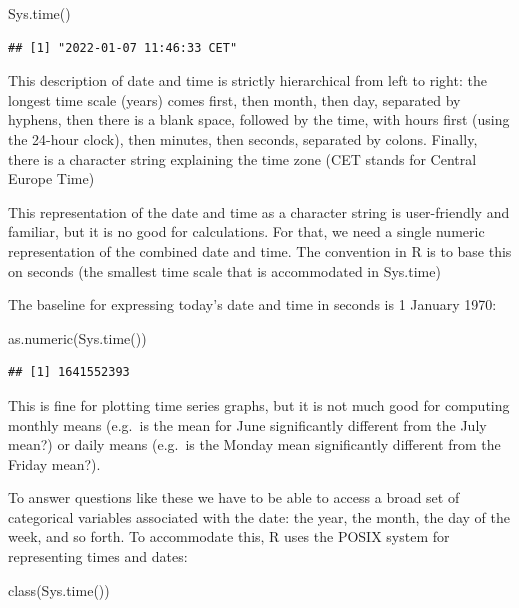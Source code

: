 \documentclass[
]{book}
\newenvironment{Shaded}{\begin{snugshade}}{\end{snugshade}}
\newcommand{\FunctionTok}[1]{\textcolor[rgb]{0.00,0.00,0.00}{#1}}
\newcommand{\NormalTok}[1]{#1}
\begin{document}
\begin{Shaded}
\begin{Highlighting}[]
\FunctionTok{Sys.time}\NormalTok{()}
\end{Highlighting}
\end{Shaded}

\begin{verbatim}
## [1] "2022-01-07 11:46:33 CET"
\end{verbatim}

This description of date and time is strictly hierarchical from left to right: the longest time scale (years) comes first, then month, then day, separated by hyphens, then there is a blank space, followed by the time, with hours first (using the 24-hour clock), then minutes, then seconds, separated by colons. Finally, there is a character string explaining the time zone (CET stands for Central Europe Time)

This representation of the date and time as a character string is user-friendly and familiar, but it is no good for calculations. For that, we need a single numeric representation of the combined date and time. The convention in R is to base this on seconds (the smallest time scale that is accommodated in Sys.time)

The baseline for expressing today's date and time in seconds is 1 January 1970:

\begin{Shaded}
\begin{Highlighting}[]
\FunctionTok{as.numeric}\NormalTok{(}\FunctionTok{Sys.time}\NormalTok{())}
\end{Highlighting}
\end{Shaded}

\begin{verbatim}
## [1] 1641552393
\end{verbatim}

This is fine for plotting time series graphs, but it is not much good for computing monthly means (e.g.~is the mean for June significantly different from the July mean?) or daily means (e.g.~is the Monday mean significantly different from the Friday mean?).

To answer questions like these we have to be able to access a broad set of categorical variables associated with the date: the year, the month, the day of the week, and so forth. To accommodate this, R uses the POSIX system for representing times and dates:

\begin{Shaded}
\begin{Highlighting}[]
\FunctionTok{class}\NormalTok{(}\FunctionTok{Sys.time}\NormalTok{())}
\end{Highlighting}
\end{Shaded}
\end{document}
